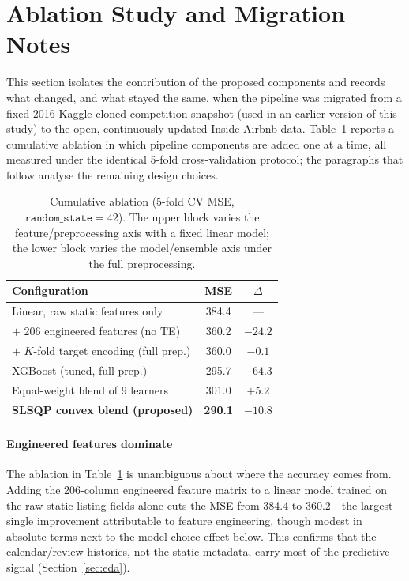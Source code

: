 \documentclass[journal]{IEEEtran}
\begin{document}
\section{Ablation Study and Migration Notes}
\label{sec:changes}
\label{sec:ablation}
This section isolates the contribution of the proposed components and records
what changed, and what stayed the same, when the pipeline was migrated from a
fixed 2016 Kaggle-cloned-competition snapshot (used in an earlier version of
this study) to the open, continuously-updated Inside Airbnb data.
Table~\ref{tab:ablation} reports a cumulative ablation in which pipeline
components are added one at a time, all measured under the identical 5-fold
cross-validation protocol; the paragraphs that follow analyse the remaining
design choices.

\begin{table}[!t]
\caption{Cumulative ablation (5-fold CV MSE, $\mathtt{random\_state}=42$). The
upper block varies the feature/preprocessing axis with a fixed linear model;
the lower block varies the model/ensemble axis under the full preprocessing.}
\label{tab:ablation}
\centering
\begin{tabular}{lcc}
\toprule
Configuration & MSE & $\Delta$ \\
\midrule
Linear, raw static features only & 384.4 & --- \\
\quad $+$ 206 engineered features (no TE) & 360.2 & $-24.2$ \\
\quad $+$ $K$-fold target encoding (full prep.) & 360.0 & $-0.1$ \\
\midrule
XGBoost (tuned, full prep.) & 295.7 & $-64.3$ \\
Equal-weight blend of 9 learners & 301.0 & $+5.2$ \\
\textbf{SLSQP convex blend (proposed)} & \textbf{290.1} & $-10.8$ \\
\bottomrule
\end{tabular}
\end{table}

\paragraph{Engineered features dominate} The ablation in
Table~\ref{tab:ablation} is unambiguous about where the accuracy comes from.
Adding the 206-column engineered feature matrix to a linear model trained on
the raw static listing fields alone cuts the MSE from 384.4 to 360.2---the
largest single improvement attributable to feature engineering, though modest
in absolute terms next to the model-choice effect below. This confirms that
the calendar/review histories, not the static metadata, carry most of the
predictive signal (Section~\ref{sec:eda}).
\end{document}
